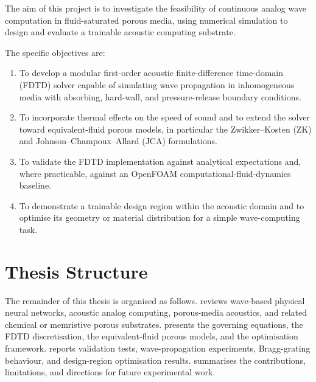The aim of this project is to investigate the feasibility of continuous analog wave computation in fluid-saturated porous media, using numerical simulation to design and evaluate a trainable acoustic computing substrate.

The specific objectives are:
\begin{enumerate}
    \item To develop a modular first-order acoustic finite-difference time-domain (FDTD) solver capable of simulating wave propagation in inhomogeneous media with absorbing, hard-wall, and pressure-release boundary conditions.
    \item To incorporate thermal effects on the speed of sound and to extend the solver toward equivalent-fluid porous models, in particular the Zwikker--Kosten (ZK) and Johnson--Champoux--Allard (JCA) formulations.
    \item To validate the FDTD implementation against analytical expectations and, where practicable, against an OpenFOAM computational-fluid-dynamics baseline.
    \item To demonstrate a trainable design region within the acoustic domain and to optimise its geometry or material distribution for a simple wave-computing task.
\end{enumerate}

\section{Thesis Structure}
\label{sec:structure}

The remainder of this thesis is organised as follows.  reviews wave-based physical neural networks, acoustic analog computing, porous-media acoustics, and related chemical or memristive porous substrates.  presents the governing equations, the FDTD discretisation, the equivalent-fluid porous models, and the optimisation framework.  reports validation tests, wave-propagation experiments, Bragg-grating behaviour, and design-region optimisation results.  summarises the contributions, limitations, and directions for future experimental work.
